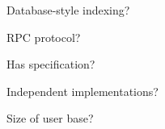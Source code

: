 \documentclass[aspectratio=169]{beamer}
\begin{document}
\begin{frame}{Database-style indexing?}
\vspace{0.5 cm}
\end{frame}

\begin{frame}{RPC protocol?}
\vspace{0.5 cm}
\end{frame}

\begin{frame}{Has specification?}
\vspace{0.5 cm}
\end{frame}

\begin{frame}{Independent implementations?}
\vspace{0.5 cm}
\end{frame}

\begin{frame}{Size of user base?}
\vspace{0.5 cm}
\end{frame}
\end{document}
